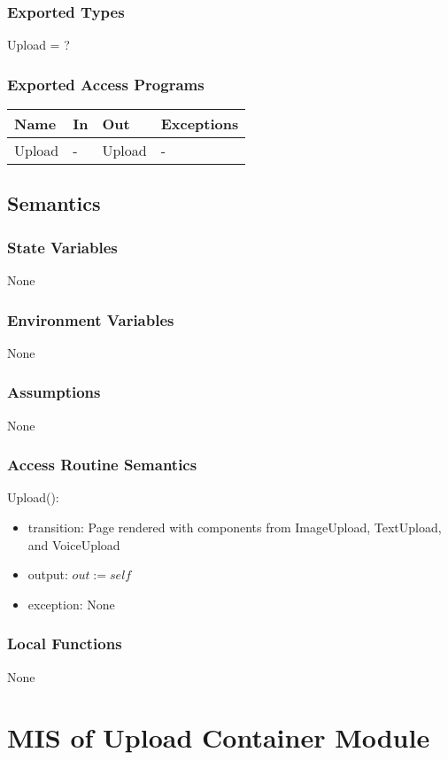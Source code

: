 \documentclass[12pt, titlepage]{article}
\begin{document}
\subsubsection{Exported Types}
Upload = ?
\subsubsection{Exported Access Programs}
\begin{center}
	\begin{tabular}{p{2cm} p{4cm} p{4cm} p{2cm}}
		\hline
		\textbf{Name} & \textbf{In} & \textbf{Out} & \textbf{Exceptions} \\
		\hline
		Upload & - & Upload & - \\
		\hline
	\end{tabular}
\end{center}
\subsection{Semantics}
\subsubsection{State Variables}
None
\subsubsection{Environment Variables}
None
\subsubsection{Assumptions}
None
\subsubsection{Access Routine Semantics}
\noindent Upload():
\begin{itemize}
	\item transition: Page rendered with components from ImageUpload, 
	TextUpload, and VoiceUpload
	\item output: $out := self$
	\item exception: None
\end{itemize}
\subsubsection{Local Functions}
None

\newpage

\section{MIS of Upload Container Module} \label{UploadContainer}
\end{document}
